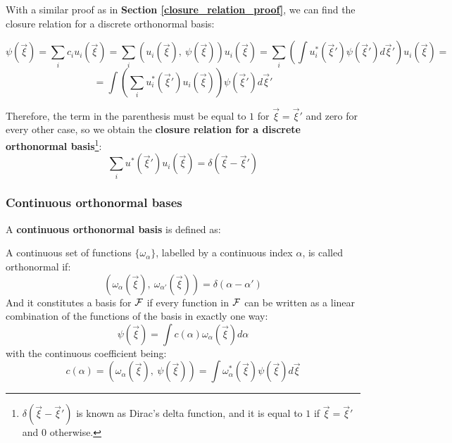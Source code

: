 With a similar proof as in \textbf{Section \ref{closure_relation_proof}}, we can find the closure relation for a discrete orthonormal basis:

\begin{equation*}
    \psi(\vec{\xi}) = \sum_i c_i u_i(\vec{\xi}) = \sum_i \left(u_i(\vec{\xi}), \ \psi(\vec{\xi})\right) u_i(\vec{\xi}) = \sum_i \left( \int u_i^* (\vec{\xi}') \psi(\vec{\xi}')d\vec{\xi}'\right)u_i(\vec{\xi})  =    
\end{equation*}
\begin{equation}
    = \int \left( \sum_i u_i^* (\vec{\xi}') u_i(\vec{\xi})\right)\psi(\vec{\xi}')d\vec{\xi}'
\end{equation}

Therefore, the term in the parenthesis must be equal to $1$ for $\vec{\xi} =\vec{\xi}'$ and zero for every other case, so we obtain the \textbf{closure relation for a discrete orthonormal basis}\footnote{$\delta(\vec{\xi}-\vec{\xi}')$ is known as Dirac's delta function, and it is equal to $1$ if $\vec{\xi} = \vec{\xi}'$ and $0$ otherwise.}:
\begin{equation}
    \sum_i u^*(\vec{\xi}')u_i(\vec{\xi}) = \delta(\vec{\xi} - \vec{\xi}')
\end{equation}

\subsubsection{Continuous orthonormal bases}

A \textbf{continuous orthonormal basis} is defined as:

\begin{definition}
    A continuous set of functions $\{\omega_\alpha\}$, labelled by a continuous index $\alpha$, is called orthonormal if:
    \begin{equation}
        \left(\omega_\alpha(\vec{\xi}), \ \omega_{\alpha'}(\vec{\xi})\right) = \delta(\alpha - \alpha')
    \end{equation}
    And it constitutes a basis for $\mathcal{F}$ if every function in $\mathcal{F}$ can be written as a linear combination of the functions of the basis in exactly one way:
    \begin{equation}
        \psi(\vec{\xi}) = \int c(\alpha) \omega_\alpha(\vec{\xi})d\alpha
    \end{equation}
    with the continuous coefficient being:
    \begin{equation}
        c(\alpha) = \left(\omega_\alpha(\vec{\xi}), \ \psi(\vec{\xi})\right) = \int \omega_\alpha^*(\vec{\xi})\psi(\vec{\xi})d\vec{\xi}
    \end{equation}    
\end{definition}

